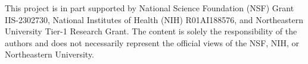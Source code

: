 \begin{acks}
This project is in part supported by National Science Foundation (NSF)
Grant IIS-2302730, National Institutes of Health (NIH) R01AI188576, and Northeastern University Tier-1 Research Grant. The content is solely the responsibility of the authors and does not necessarily represent the official views of the NSF, NIH, or Northeastern University.
\end{acks}